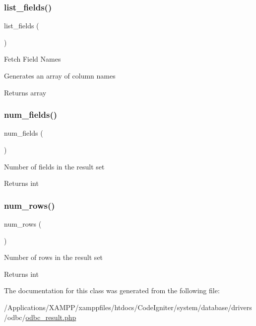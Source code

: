 \subsubsection{\texorpdfstring{list\+\_\+fields()}{list\_fields()}}
{\footnotesize\ttfamily list\+\_\+fields (\begin{DoxyParamCaption}{ }\end{DoxyParamCaption})}

Fetch Field Names

Generates an array of column names

\begin{DoxyReturn}{Returns}
array 
\end{DoxyReturn}
\mbox{\label{class_c_i___d_b__odbc__result_af831bf363e4d7d661a717a4932af449d}} 
\subsubsection{\texorpdfstring{num\+\_\+fields()}{num\_fields()}}
{\footnotesize\ttfamily num\+\_\+fields (\begin{DoxyParamCaption}{ }\end{DoxyParamCaption})}

Number of fields in the result set

\begin{DoxyReturn}{Returns}
int 
\end{DoxyReturn}
\mbox{\label{class_c_i___d_b__odbc__result_a218657c303ee499b97710ab0cd2f5d6e}} 
\subsubsection{\texorpdfstring{num\+\_\+rows()}{num\_rows()}}
{\footnotesize\ttfamily num\+\_\+rows (\begin{DoxyParamCaption}{ }\end{DoxyParamCaption})}

Number of rows in the result set

\begin{DoxyReturn}{Returns}
int 
\end{DoxyReturn}


The documentation for this class was generated from the following file\+:\begin{DoxyCompactItemize}
\item 
/\+Applications/\+X\+A\+M\+P\+P/xamppfiles/htdocs/\+Code\+Igniter/system/database/drivers/odbc/\mbox{\hyperlink{odbc__result_8php}{odbc\+\_\+result.\+php}}\end{DoxyCompactItemize}
